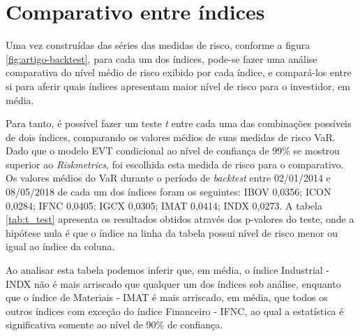 \documentclass[1p]{elsarticle}
\theoremstyle{definition}
\begin{document}


\section{Comparativo entre índices}
\label{sec:comparativo}

Uma vez construídas das séries das medidas de risco, conforme a figura \ref{fig:artigo-backtest}, para cada um dos índices, pode-se fazer uma análise comparativa do nível médio de risco exibido por cada índice, e compará-los entre si para aferir quais índices apresentam maior nível de risco para o investidor, em média.

Para tanto, é possível fazer um teste \emph{t} entre cada uma das combinações possíveis de dois índices, comparando os valores médios de suas medidas de risco VaR. Dado que o modelo EVT condicional ao nível de confiança de 99\% se mostrou superior ao \emph{Riskmetrics}, foi escolhida esta medida de risco para o comparativo. Os valores médios do VaR durante o período de \emph{backtest} entre 02/01/2014 e 08/05/2018 de cada um dos índices foram os seguintes: IBOV 0,0356; ICON 0,0284; IFNC 0,0405; IGCX 0,0305; IMAT 0,0414; INDX 0,0273. A tabela \ref{tab:t_test} apresenta os resultados obtidos através dos p-valores do teste, onde a hipótese nula é que o índice na linha da tabela possui nível de risco menor ou igual ao índice da coluna.
 


Ao analisar esta tabela podemos inferir que, em média, o índice Industrial - INDX não é mais arriscado que qualquer um  dos índices sob análise, enquanto que o  índice de Materiais - IMAT é mais arriscado, em média, que todos os outros índices com exceção do índice Financeiro - IFNC, ao qual a estatística é significativa somente ao nível de 90\% de confiança.
\end{document}
